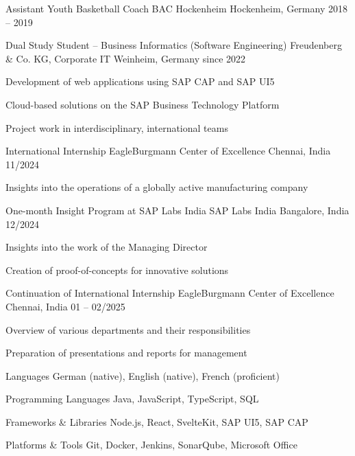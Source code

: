 \documentclass[11pt, a4paper]{awesome-cv}
\begin{document}
\begin{cventries}

\cventry
  {Assistant Youth Basketball Coach}
  {BAC Hockenheim}
  {Hockenheim, Germany}
  {2018 -- 2019}
  {}

\cventry
  {Dual Study Student – Business Informatics (Software Engineering)}
  {Freudenberg \& Co. KG, Corporate IT}
  {Weinheim, Germany}
  {since 2022}
  {
    \begin{cvitems}
      \item {Development of web applications using SAP CAP and SAP UI5}
      \item {Cloud-based solutions on the SAP Business Technology Platform}
      \item {Project work in interdisciplinary, international teams}
    \end{cvitems}
  }

\cventry
  {International Internship}
  {EagleBurgmann Center of Excellence}
  {Chennai, India}
  {11/2024}
  {
    \begin{cvitems}
      \item {Insights into the operations of a globally active manufacturing company}
    \end{cvitems}
  }

\cventry
  {One-month Insight Program at SAP Labs India}
  {SAP Labs India}
  {Bangalore, India}
  {12/2024}
  {
    \begin{cvitems}
      \item {Insights into the work of the Managing Director}
      \item {Creation of proof-of-concepts for innovative solutions}
    \end{cvitems}
  }

\cventry
  {Continuation of International Internship}
  {EagleBurgmann Center of Excellence}
  {Chennai, India}
  {01 -- 02/2025}
  {
    \begin{cvitems}
      \item {Overview of various departments and their responsibilities}
      \item {Preparation of presentations and reports for management}
    \end{cvitems}
  }

\end{cventries}


\begin{cvskills}

\cvskill
{Languages}
{German (native), English (native), French (proficient)}

\cvskill
{Programming Languages}
{Java, JavaScript, TypeScript, SQL}

\cvskill
{Frameworks \& Libraries}
{Node.js, React, SvelteKit, SAP UI5, SAP CAP}

\cvskill
{Platforms \& Tools}
{Git, Docker, Jenkins, SonarQube, Microsoft Office}

\end{cvskills}
\end{document}
